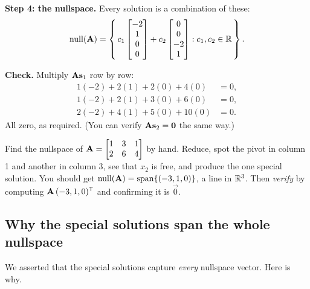 \begin{example}
\textbf{Step 4: the nullspace.} Every solution is a combination of these:
\[
  \operatorname{null}(\mathbf{A}) = \left\{\, c_1 \begin{bmatrix}-2\\1\\0\\0\end{bmatrix} + c_2\begin{bmatrix}0\\0\\-2\\1\end{bmatrix}
  : c_1, c_2 \in\mathbb{R} \,\right\}.
\]

\textbf{Check.} Multiply $\mathbf{A}\mathbf{s}_1$ row by row:
\begin{align*}
  1(-2)+2(1)+2(0)+4(0) &= 0,\\
  1(-2)+2(1)+3(0)+6(0) &= 0,\\
  2(-2)+4(1)+5(0)+10(0) &= 0.
\end{align*}
All zero, as required. (You can verify $\mathbf{A}\mathbf{s}_2 = \mathbf{0}$ the same way.)
\end{example}

\begin{labbox}
Find the nullspace of $\mathbf{A}=\begin{bmatrix}1 & 3 & 1\\2 & 6 & 4\end{bmatrix}$
by hand. Reduce, spot the pivot in column 1 and another in column 3, see that $x_2$
is free, and produce the one special solution. You should get $\operatorname{null}(\mathbf{A}) =
\operatorname{span}\{(-3,1,0)\}$, a line in $\mathbb{R}^3$. Then \emph{verify} by computing
$\mathbf{A}\,(-3,1,0)^{\mathsf{T}}$ and confirming it is $\vec 0$.
\end{labbox}

\subsection{Why the special solutions span the whole nullspace}

We asserted that the special solutions capture \emph{every} nullspace vector.
Here is why.

